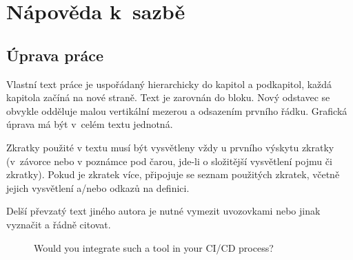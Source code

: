 
\chapter{Nápověda k~sazbě}

\section{Úprava práce}

Vlastní text práce je uspořádaný hierarchicky do kapitol a podkapitol,
každá kapitola začíná na nové straně. Text je zarovnán do bloku. Nový odstavec
se obvykle odděluje malou vertikální mezerou a odsazením prvního řádku. Grafická
úprava má být v~celém textu jednotná.

Zkratky použité v textu musí být vysvětleny vždy u prvního výskytu zkratky (v~závorce nebo
v poznámce pod čarou, jde-li o složitější vysvětlení pojmu či zkratky). Pokud je zkratek
více, připojuje se seznam použitých zkratek, včetně jejich vysvětlení a/nebo odkazů
na definici.

Delší převzatý text jiného autora je nutné vymezit uvozovkami nebo jinak vyznačit a řádně
citovat.



\begin{figure}
    \centering
    \caption{Would you integrate such a tool in your CI/CD process?}
\end{figure}

